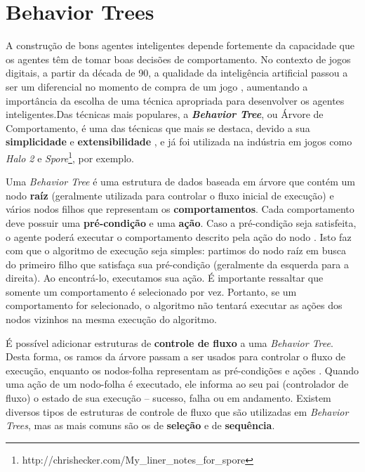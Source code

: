 \section{\label{section:behavior-trees}Behavior Trees}
A construção de bons agentes inteligentes depende fortemente da capacidade que
os agentes têm de tomar boas decisões de comportamento. No contexto de jogos
digitais, a partir da década de 90, a qualidade da inteligência artificial
passou a ser um diferencial no momento de compra de um jogo \cite[Cap.
1]{Millington:2009:AIG:1795711}, aumentando a importância da escolha de uma
técnica apropriada para desenvolver os agentes inteligentes.Das técnicas mais
populares, a \textbf{\textit{Behavior Tree}}, ou Árvore de Comportamento, é uma
das técnicas que mais se destaca, devido a sua \textbf{simplicidade} e
\textbf{extensibilidade} \cite[Cap.  4]{Rabin:2013:GAP:2566761}, e já foi
utilizada na indústria em jogos como \textit{Halo 2} \cite[Cap.
5]{Millington:2009:AIG:1795711} e
\textit{Spore}\footnote{http://chrishecker.com/My\_liner\_notes\_for\_spore},
por exemplo.

Uma \textit{Behavior Tree} é uma estrutura de dados baseada em árvore que contém
um nodo \textbf{raíz} (geralmente utilizada para controlar o fluxo inicial de
execução) e vários nodos filhos que representam os \textbf{comportamentos}. Cada
comportamento deve possuir uma \textbf{pré-condição} e uma \textbf{ação}. Caso a
pré-condição seja satisfeita, o agente poderá executar o comportamento descrito
pela ação do nodo \cite[Cap. 4]{Rabin:2013:GAP:2566761}. Isto faz com que o
algoritmo de execução seja simples: partimos do nodo raíz em busca do primeiro
filho que satisfaça sua pré-condição (geralmente da esquerda para a direita). Ao
encontrá-lo, executamos sua ação. É importante ressaltar que somente um
comportamento é selecionado por vez. Portanto, se um comportamento for
selecionado, o algoritmo não tentará executar as ações dos nodos vizinhos na
mesma execução do algoritmo.

É possível adicionar estruturas de \textbf{controle de fluxo} a uma
\textit{Behavior Tree}. Desta forma, os ramos da árvore passam a ser usados para
controlar o fluxo de execução, enquanto os nodos-folha representam as
pré-condições e ações \cite[Cap. 10]{Rabin:2015:GAP:2821138}. Quando uma ação de
um nodo-folha é executado, ele informa ao seu pai (controlador de fluxo) o
estado de sua execução -- sucesso, falha ou em andamento. Existem diversos
tipos de estruturas de controle de fluxo que são utilizadas em \textit{Behavior
Trees}, mas as mais comuns são os de \textbf{seleção} e de \textbf{sequência}.

